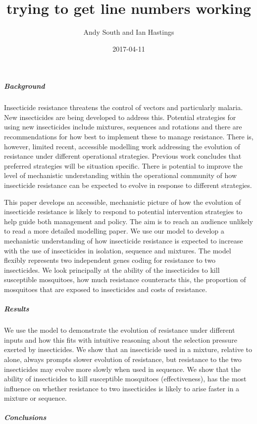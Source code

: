 \documentclass[11pt,]{article}
\title{trying to get line numbers working}
\author{Andy South and Ian Hastings}
\date{2017-04-11}
\let\oldsubparagraph\subparagraph
\renewcommand{\subparagraph}[1]{\oldsubparagraph{#1}\mbox{}}
\begin{document}
\maketitle

\subparagraph{Background}\label{background}

Insecticide resistance threatens the control of vectors and particularly
malaria. New insecticides are being developed to address this. Potential
strategies for using new insecticides include mixtures, sequences and
rotations and there are recommendations for how best to implement these
to manage resistance. There is, however, limited recent, accessible
modelling work addressing the evolution of resistance under different
operational strategies. Previous work concludes that preferred
strategies will be situation specific. There is potential to improve the
level of mechanistic understanding within the operational community of
how insecticide resistance can be expected to evolve in response to
different strategies.

This paper develops an accessible, mechanistic picture of how the
evolution of insecticide resistance is likely to respond to potential
intervention strategies to help guide both management and policy. The
aim is to reach an audience unlikely to read a more detailed modelling
paper. We use our model to develop a mechanistic understanding of how
insecticide resistance is expected to increase with the use of
insecticides in isolation, sequence and mixtures. The model flexibly
represents two independent genes coding for resistance to two
insecticides. We look principally at the ability of the insecticides to
kill susceptible mosquitoes, how much resistance counteracts this, the
proportion of mosquitoes that are exposed to insecticides and costs of
resistance.

\subparagraph{Results}\label{results}

We use the model to demonstrate the evolution of resistance under
different inputs and how this fits with intuitive reasoning about the
selection pressure exerted by insecticides. We show that an insecticide
used in a mixture, relative to alone, always prompts slower evolution of
resistance, but resistance to the two insecticides may evolve more
slowly when used in sequence. We show that the ability of insecticides
to kill susceptible mosquitoes (effectiveness), has the most influence
on whether resistance to two insecticides is likely to arise faster in a
mixture or sequence.

\subparagraph{Conclusions}\label{conclusions}
\end{document}

